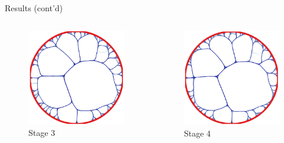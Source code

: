 \documentclass{beamer}
\begin{document}
\begin{frame}{Results (cont'd)}
	\begin{columns}
		\begin{column}{.48\textwidth}
			\begin{figure}[ht]
				\centering
				\includegraphics[width=1\textwidth]{img/stage3.png}
				\caption{Stage 3\label{fig:stage3}}
			\end{figure}
		\end{column}
		\begin{column}{.48\textwidth}
			\begin{figure}[ht]
				\centering
				\includegraphics[width=1\textwidth]{img/stage4.png}
				\caption{Stage 4\label{fig:stage4}}
			\end{figure}
		\end{column}
	\end{columns}
\end{frame}
\end{document}
